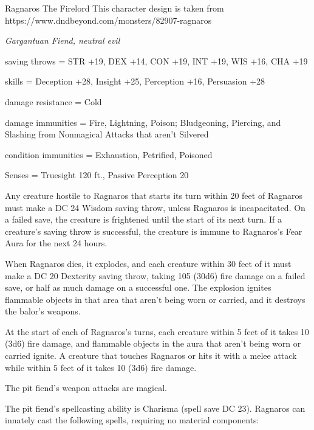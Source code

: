 \begin{monsterbox}{Ragnaros The Firelord}
	This character design is taken from https://www.dndbeyond.com/monsters/82907-ragnaros
	\begin{hangingpar}
		\textit{Gargantuan Fiend, neutral evil}
	\end{hangingpar}
	\dndline%
	\basics[%
	armorclass = 23,
	hitpoints  = 533,
	speed      = 50 ft
	]
	\dndline%
	\stats[
	STR = \stat{30}, %
	DEX = \stat{20},
	CON = \stat{30},
	INT = \stat{30},
	WIS = \stat{24},
	CHA = \stat{30}
	]
	\dndline%
	\details[%
	languages = {All, Telepathy 5 miles},
	challenge = 30
	]
	\dndline%
	saving throws = STR +19, DEX +14, CON +19, INT +19, WIS +16, CHA +19
		
	skills = Deception +28, Insight +25, Perception +16, Persuasion +28
		
	damage resistance = Cold
	 
	damage immunities = Fire, Lightning, Poison; Bludgeoning, Piercing, and Slashing from Nonmagical Attacks that aren't Silvered
		
	condition immunities = Exhaustion, Petrified, Poisoned	
	
	Senses = Truesight 120 ft., Passive Perception 20
	
	\dndline%
	\begin{monsteraction}
		Any creature hostile to Ragnaros that starts its turn within 20 feet of Ragnaros must make a DC 24 Wisdom saving throw, unless Ragnaros is incapacitated. On a failed save, the creature is frightened until the start of its next turn. If a creature's saving throw is successful, the creature is immune to Ragnaros's Fear Aura for the next 24 hours.
	\end{monsteraction}	
	\begin{monsteraction}
		When Ragnaros dies, it explodes, and each creature within 30 feet of it must make a DC 20 Dexterity saving throw, taking 105 (30d6) fire damage on a failed save, or half as much damage on a successful one. The explosion ignites flammable objects in that area that aren't being worn or carried, and it destroys the balor's weapons.
	\end{monsteraction}	
	\begin{monsteraction}
		At the start of each of Ragnaros's turns, each creature within 5 feet of it takes 10 (3d6) fire damage, and flammable objects in the aura that aren't being worn or carried ignite. A creature that touches Ragnaros or hits it with a melee attack while within 5 feet of it takes 10 (3d6) fire damage.
	\end{monsteraction}	
	\begin{monsteraction}
		The pit fiend's weapon attacks are magical.
	\end{monsteraction}	
	\begin{monsteraction}
		The pit fiend's spellcasting ability is Charisma (spell save DC 23). Ragnaros can innately cast the following spells, requiring no material components:
		

\end{monsteraction}
\end{monsterbox}
